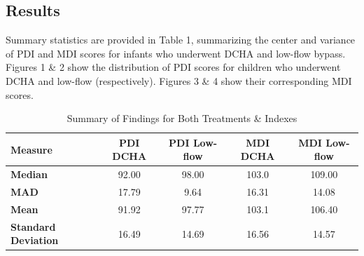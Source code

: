 \documentclass{article}
\begin{document}
\begin{enumerate}
		\subsection*{Results}
		Summary statistics are provided in Table 1, summarizing the center and variance of PDI and MDI scores for infants who underwent DCHA and low-flow bypass. Figures 1 \& 2 show the distribution of PDI scores for children who underwent DCHA and low-flow (respectively). Figures 3 \& 4 show their corresponding MDI scores.
		\begin{table}[h!]
			\centering
			\footnotesize
			\caption{Summary of Findings for Both Treatments \& Indexes}
			\label{tab:summary_statistics}
			\begin{tabular}{lcccc}
			\toprule
			\textbf{Measure}          & \textbf{PDI DCHA} & \textbf{PDI Low-flow} & \textbf{MDI DCHA} & \textbf{MDI Low-flow} \\ 
			\midrule
			\textbf{Median}           & 92.00             & 98.00                & 103.0             & 109.00              \\ 
			\textbf{MAD}              & 17.79             & 9.64                 & 16.31             & 14.08               \\ 
			\textbf{Mean}             & 91.92             & 97.77                & 103.1             & 106.40              \\ 
			\textbf{Standard Deviation} & 16.49            & 14.69                & 16.56             & 14.57               \\ 
			\bottomrule
			\end{tabular}
		\end{table}


\end{enumerate}
\end{document}
